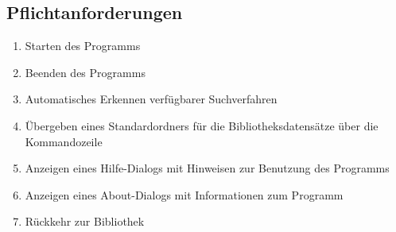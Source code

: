 
\newcommand\chk{\marginpar{$\CheckedBox$}}
\newcommand\nochk{\marginpar{$\Box$}}

\subsection{Pflichtanforderungen}
\begin{enumerate} [label=\bfseries /F \arabic*0/, leftmargin=*]
	\item Starten des Programms \chk
	\item Beenden des Programms \chk
	\item Automatisches Erkennen verfügbarer Suchverfahren \chk
	\item Übergeben eines Standardordners für die Bibliotheksdatensätze über die Kommandozeile \chk
	\item Anzeigen eines Hilfe-Dialogs mit Hinweisen zur Benutzung des Programms \chk
	\item Anzeigen eines About-Dialogs mit Informationen zum Programm \chk
	\item Rückkehr zur Bibliothek \chk
	\newline
 

\end{enumerate}
